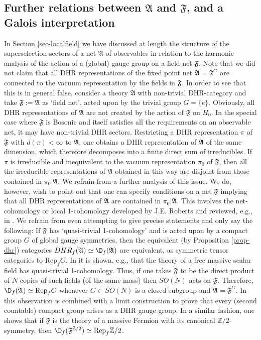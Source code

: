 \documentclass[11pt]{article}
\newcommand{\alg}[1]{\mathfrak{#1}}
\theoremstyle{definition}
\theoremstyle{definition}
\theoremstyle{remark}
\def\7#1{{\mathbb #1}}
\newcommand{\Rep}{\mathrm{Rep}}
\begin{document}
\subsection{Further relations between $\alg{A}$ and $\alg{F}$, and a Galois interpretation}
In Section \ref{sec-localfield} we have discussed at
length the structure of the superselection sectors of a
net $\alg{A}$ of observables in relation to the
harmonic analysis of the action of a (global) gauge
group on a field net $\alg{F}$. Note that we did not
claim that all DHR representations of the fixed point
net $\alg{A}=\alg{F}^G$ are connected to the vacuum
representation by the fields in $\alg{F}$. In order to
see that this is in general false, consider a theory
$\alg{A}$ with non-trivial DHR-category and take
$\alg{F}:=\alg{A}$ as `field net', acted upon by the
trivial group $G=\{e\}$. Obviously, all DHR
representations of $\alg{A}$ are not created by the
action of $\alg{F}$ on $H_0$. In the special case where
$\alg{F}$ is Bosonic and itself satisfies all the
requirements on an observable net, it may have
non-trivial DHR sectors. Restricting a DHR
representation $\pi$ of $\alg{F}$ with $d(\pi)<\infty$
to $\alg{A}$, one obtains a DHR representation of
$\alg{A}$ of the same dimension, which therefore
decomposes into a finite direct sum of irreducibles. If
$\pi$ is irreducible and inequivalent to the vacuum
representation $\pi_0$ of $\alg{F}$, then all the
irreducible representations of $\alg{A}$ obtained in
this way are disjoint from those contained in
$\pi_0|\alg{A}$. We refrain from a further analysis of
this issue.  We do, however, wish to point out that one
can specify conditions on a net $\alg{F}$ implying that
all DHR representations of $\alg{A}$ are contained in
$\pi_0|\alg{A}$. This involves the net-cohomology or
local 1-cohomology developed by J.E. Roberts and
reviewed, e.g., in \cite[\S 3.4]{rob-lec}. We refrain
from even attempting to give precise statements and
only say the following: If $\alg{F}$ has `quasi-trivial
1-cohomology' and is acted upon by a compact group $G$
of global gauge symmetries, then the equivalent (by
Proposition \ref{prop-dhr}) categories
$DHR_f(\alg{A})\simeq\D_f(\alg{A})$ are equivalent, as
symmetric tensor categories to $\Rep_fG$. In
\cite{goldstone} it is shown, e.g., that the theory of
a free massive scalar field has quasi-trivial
1-cohomology. Thus, if one takes $\alg{F}$ to be the
direct product of $N$ copies of such fields (of the
same mass) then $SO(N)$ acts on $\alg{F}$. Therefore,
$\D_f(\alg{A})\simeq\Rep_fG$ whenever $G\subset SO(N)$
is a closed subgroup and $\alg{A}=\alg{F}^G$. In
\cite{dop-groups} this observation is combined with a
limit construction to prove that every (second
countable) compact group arises as a DHR gauge
group. In a similar fashion, one shows that if
$\alg{F}$ is the theory of a massive Fermion with its
canonical $\7Z/2$-symmetry, then
$\D_f(\alg{F}^{\7Z/2})\simeq\Rep_f\7Z/2$.
\end{document}
